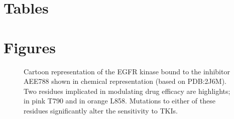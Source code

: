 \documentclass{bmcart}
\begin{document}




\section*{Tables}

\begin{table}[h!]
\caption{Experiment 1 executes the 7 stages of the ESMACS protocol with
a null workload; Experiment 2 uses the actual MD workload of the ESMACS
protocol. ESMACS protocol with EGFR kinase workload: (1) Untar configuration
files; (2) Preprep; (3) Minimize with decreasing restraints; (4)
Equilibration: NVT simulation at 50K, with restraints; (5) Equilibration: NPT
simulation at 300K, with decreasing restraints; (6) Equilibration: NPT at
300k, no constraints; (7) Tarball output files.}
  \label{tab:exp}
\end{table}


\section*{Figures}


\begin{figure}[h!]
\caption{
  Cartoon representation of the EGFR kinase bound to the inhibitor
  AEE788 shown in chemical representation (based on PDB:2J6M). Two residues
  implicated in modulating drug efficacy are highlights; in pink T790 and in
  orange L858. Mutations to either of these residues significantly alter the
  sensitivity to TKIs.}
  \label{fig:egfr}
  \end{figure}
\end{document}
